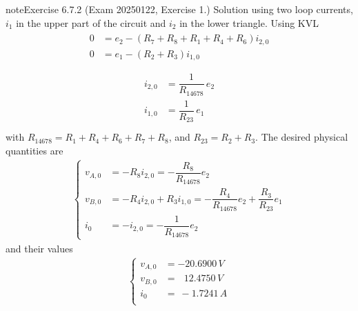 \documentclass[letterpaper,10pt,english]{jupyterBook}
\begin{document}
\begin{sphinxadmonition}{note}{Exercise 6.7.2 (Exam 2025\sphinxhyphen{}01\sphinxhyphen{}22, Exercise 1.)}
\sphinxAtStartPar
Solution using two loop currents, \(i_1\) in the upper part of the circuit and \(i_2\) in the lower triangle. Using KVL
\begin{equation*}
\begin{split}\begin{aligned}
  0 & = e_2 - (R_7+R_8+R_1+R_4+R_6) i_{2,0} \\
  0 & = e_1 - (R_2+R_3) i_{1,0} \\
\end{aligned}
\end{split}
\end{equation*}\begin{equation*}
\begin{split}
\begin{aligned}
  i_{2,0} & = \dfrac{1}{R_{14678}} \, e_2 \\
  i_{1,0} & = \dfrac{1}{R_{23}} \, e_1 \\
\end{aligned}\end{split}
\end{equation*}
\sphinxAtStartPar
with \(R_{14678} = R_1+R_4+R_6+R_7+R_8\), and \(R_{23} = R_2 + R_3\). The desired physical quantities are
\begin{equation*}
\begin{split}\begin{cases}
  v_{A,0} & = - R_8 i_{2,0} = -\dfrac{R_8}{R_{14678}} e_2 \\ 
  v_{B,0} & = - R_4 i_{2,0} + R_3 i_{1,0} = - \dfrac{R_4}{R_{14678}} e_2 + \dfrac{R_3}{R_{23}} e_1 \\
  i_{0} & = - i_{2,0} = - \dfrac{1}{R_{14678}} e_2
\end{cases}\end{split}
\end{equation*}
\sphinxAtStartPar
and their values
\begin{equation*}
\begin{split}\begin{cases}
 v_{A,0} & =     - 20.6900 \, V \\
 v_{B,0} & = \ \ \ 12.4750 \, V \\
   i_{0} & = \    - 1.7241 \, A \\
\end{cases}\end{split}
\end{equation*}
\begin{figure}[htbp]
\centering

\noindent{}
\end{figure}

\end{sphinxadmonition}
\end{document}
